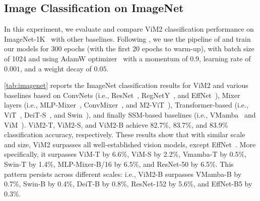 \documentclass{article}
\newcommand{\head}[1]{\vspace{1.7mm}\noindent{{\textcolor{c1}{\bf #1.}}}}
\begin{document}
\begin{table}[t]
{\begin{tabular}{lccc}
\end{tabular}
}
\normalsize
\label{tab:imagenet}
\end{table}














\subsection{Image Classification on ImageNet}\label{sec:imagenet}
\head{Setup}
In this experiment, we evaluate and compare ViM2 classification performance on ImageNet-1K~\citep{deng2009imagenet} with other baselines. Following \citet{liu2024vmamba}, we use the pipeline of \citet{liu2022swin} and train our models for 300 epochs (with the first 20 epochs to warm-up), with batch size of 1024 and using AdamW optimizer~\citep{loshchilov2018decoupled} with a momentum of $0.9$, learning rate of $0.001$, and a weight decay of $0.05$.


\head{Results}
\autoref{tab:imagenet} reports the ImageNet classification results for ViM2 and various baselines based on ConvNets (i.e., ResNet~\citep{He2016resnet}, RegNetY~\citep{radosavovic2020designing}, and EffNet~\citep{Tan2019EfficientNet}), Mixer layers (i.e., MLP-Mixer~\citep{tolstikhin2021mlp}, ConvMixer~\citep{trockman2023patches}, and M2-ViT~\citep{fu2023monarch}), Transformer-based (i.e., ViT~\citep{dosovitskiy2021ViT}, DeiT-S~\citep{touvron2021training}, and Swin~\citep{liu2021swin}), and finally SSM-based baselines (i.e., VMamba~\citep{liu2024vmamba} and ViM~\citep{zhu2024ViM}). ViM2-T, ViM2-S, and ViM2-B achieve 82.7\%, 83.7\%, and 83.9\% classification accuracy, respectively. These results show that with similar scale and size, ViM2 surpasses all well-established vision models, except EffNet~\citep{Tan2019EfficientNet}. More specifically, it surpasses ViM-T by 6.6\%, ViM-S by 2.2\%, Vmamba-T by 0.5\%, Swin-T by 1.4\%, MLP-Mixer-B/16 by 6.5\%, and ResNet-50 by 6.5\%. This pattern persists across different scales: i.e., ViM2-B surpasses VMamba-B by 0.7\%, Swin-B by 0.4\%, DeiT-B by 0.8\%, ResNet-152 by 5.6\%, and EffNet-B5 by 0.3\%. 
\end{document}

